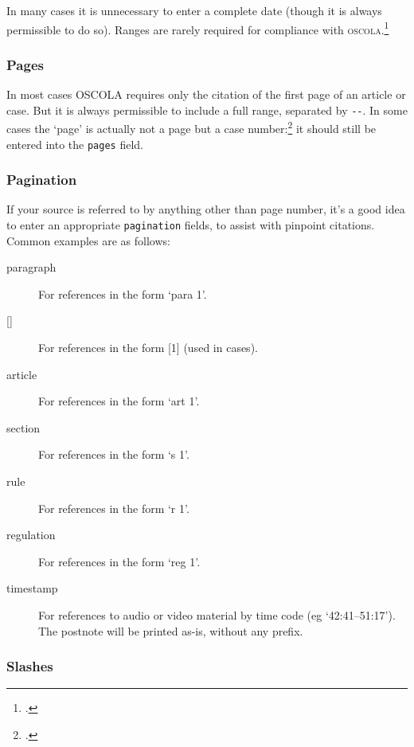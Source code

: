 \documentclass[a4paper,
               11pt,
	       DIV=1,			   
	       footinclude=false]
	      {scrartcl}
\newcommand{\oscolashort}{\textsc{oscola}\nocite{oscola}}
\begin{document}
In many cases it is unnecessary to enter a complete date (though it is
always permissible to do so). Ranges are rarely required for
compliance with \oscolashort.\footcite[They are needed only when referring
to sessions of Parliament: see][40]{oscola}

\subsubsection{Pages}

In most cases OSCOLA requires only the citation of the first page of
an article or case. But it is always permissible to include a full
range, separated by \verb|--|. In some cases the `page' is actually
not a page but a case number:\footcite[See, eg,][18]{oscola} it should
still be entered into the \texttt{pages} field.

\subsubsection{Pagination\label{pagination}}

If your source is referred to by anything other than page number, it's a good idea to enter an appropriate \texttt{pagination} fields, to assist with pinpoint citations. Common examples are as follows:
\begin{description}
\item[paragraph] For references in the form `para 1'.
\item[{[]}] For references in the form [1] (used in cases).
\item[article] For references in the form `art 1'.
\item[section] For references in the form `s 1'.
\item[rule] For references in the form `r 1'.
\item[regulation] For references in the form `reg 1'.
\item[timestamp] For references to audio or video material by time
  code (eg `42:41--51:17'). The postnote will be printed as-is,
  without any prefix.
\end{description}

\subsubsection{Slashes}
\end{document}
